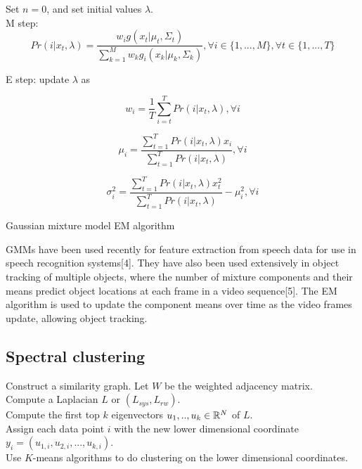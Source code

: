 \begin{refsection}
\begin{algorithm}[H]
	\SetAlgoLined
	Set $n=0$, and set initial values $\lambda$.\\
	
	M step: 
	$$Pr(i|x_t,\lambda)=\frac{w_i g(x_t|\mu_t,\Sigma_t)}{\sum_{k=1}^M w_k g_i(x_k|\mu_k, \Sigma_k)},\forall i\in\{1,...,M\}, \forall t\in \{1,...,T\}$$
	
	
	E step: update $\lambda$ as

	$$w_i = \frac{1}{T} \sum_{i=t}^T Pr(i|x_t,\lambda),\forall i$$
	
	$$\mu_i = \frac{\sum_{t=1}^T Pr(i|x_t,\lambda) x_i}{\sum_{t=1}^T Pr(i|x_t,\lambda)},\forall i$$
	
	
	$$\sigma_i^2 = \frac{\sum_{t=1}^T Pr(i|x_t,\lambda) x_t^2}{\sum_{t=1}^T Pr(i|x_t,\lambda)} - \mu_i^2,\forall i$$
	
	
	\caption{Gaussian mixture model EM algorithm}
\end{algorithm}

\begin{remark}[applications]
GMMs have been used recently for feature extraction from speech data for use in speech recognition systems[4]. They have also been used extensively in object tracking of multiple objects, where the number of mixture components and their means predict object locations at each frame in a video sequence[5]. The EM algorithm is used to update the component means over time as the video frames update, allowing object tracking.	
\end{remark}


\subsection{Spectral clustering}


\begin{algorithm}[H]
	\SetAlgoLined
	Construct a similarity graph. Let $W$ be the weighted adjacency matrix.\\
	Compute a Laplacian $L$ or $(L_{sys},L_{rw})$.\\
	Compute the first top $k$ eigenvectors $u_1,..,u_k \in \mathbb{R}^N$ of $L$.\\
	Assign each data point $i$ with the new lower dimensional coordinate $y_i = (u_{1,i},u_{2,i},...,u_{k,i})$.\\
	Use $K$-means algorithms to do clustering on the lower dimensional coordinates.
	

\end{algorithm}
\end{refsection}
